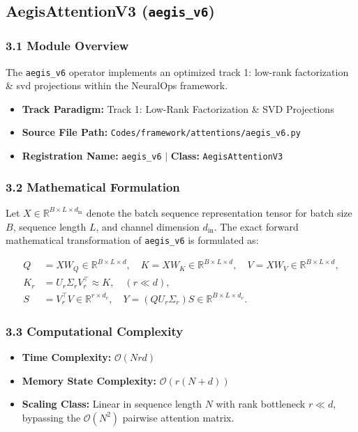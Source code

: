 \subsection{AegisAttentionV3 (\texttt{aegis\_v6})}
\label{sec:app_module_aegis_v6}

\subsubsection*{3.1 Module Overview}
The \texttt{aegis\_v6} operator implements an optimized track 1: low-rank factorization \& svd projections within the NeuralOps framework.
\begin{itemize}
    \item \textbf{Track Paradigm:} Track 1: Low-Rank Factorization \& SVD Projections
    \item \textbf{Source File Path:} \texttt{Codes/framework/attentions/aegis\_v6.py}
    \item \textbf{Registration Name:} \texttt{aegis\_v6} $\mid$ \textbf{Class:} \texttt{AegisAttentionV3}
\end{itemize}

\subsubsection*{3.2 Mathematical Formulation}
Let $X \in \mathbb{R}^{B \times L \times d_{\text{in}}}$ denote the batch sequence representation tensor for batch size $B$, sequence length $L$, and channel dimension $d_{\text{in}}$. The exact forward mathematical transformation of \texttt{aegis\_v6} is formulated as:

\begin{align}
Q &= X W_Q \in \mathbb{R}^{B \times L \times d}, \quad K = X W_K \in \mathbb{R}^{B \times L \times d}, \quad V = X W_V \in \mathbb{R}^{B \times L \times d}, \\
K_r &= U_r \Sigma_r V_r^\top \approx K, \quad (r \ll d), \\
S &= V_r^\top V \in \mathbb{R}^{r \times d_v}, \quad Y = (Q U_r \Sigma_r) S \in \mathbb{R}^{B \times L \times d_v}.
\end{align}


\subsubsection*{3.3 Computational Complexity}
\begin{itemize}
    \item \textbf{Time Complexity:} $\mathcal{O}(N r d)$
    \item \textbf{Memory State Complexity:} $\mathcal{O}(r(N + d))$
    \item \textbf{Scaling Class:} Linear in sequence length $N$ with rank bottleneck $r \ll d$, bypassing the $\mathcal{O}(N^2)$ pairwise attention matrix.
\end{itemize}

